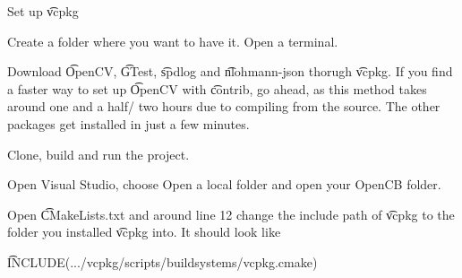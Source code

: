\begin{enumeratenum}
    \item Set up \t{vcpkg}
    \begin{enumeratenum}
        \item Create a folder where you want to have it. Open a terminal.
        \item {}
        \item {}
        \item {}
        \item {}
    \end{enumeratenum}
    \item Download \t{OpenCV}, \t{GTest}, \t{spdlog} and \t{nlohmann-json} thorugh \t{vcpkg}. If you find a faster way to set up \t{OpenCV} with \t{contrib}, go ahead, as this method takes around one and a half/ two hours due to compiling from the source. The other packages get installed in just a few minutes.
    \begin{enumeratenum}
        \item {}
        \item {}
        \item {}
        \item {}
        \item {}
    \end{enumeratenum}
    \item Clone, build and run the project.
    \begin{enumeratenum}
        \item {}
        \item Open Visual Studio, choose Open a local folder and open your OpenCB folder. 
        \item Open \t{CMakeLists.txt} and around line 12 change the include path of \t{vcpkg} to the folder you installed \t{vcpkg} into. It should look like
        
        \t{INCLUDE(.../vcpkg/scripts/buildsystems/vcpkg.cmake)}
        

\end{enumeratenum}
\end{enumeratenum}

